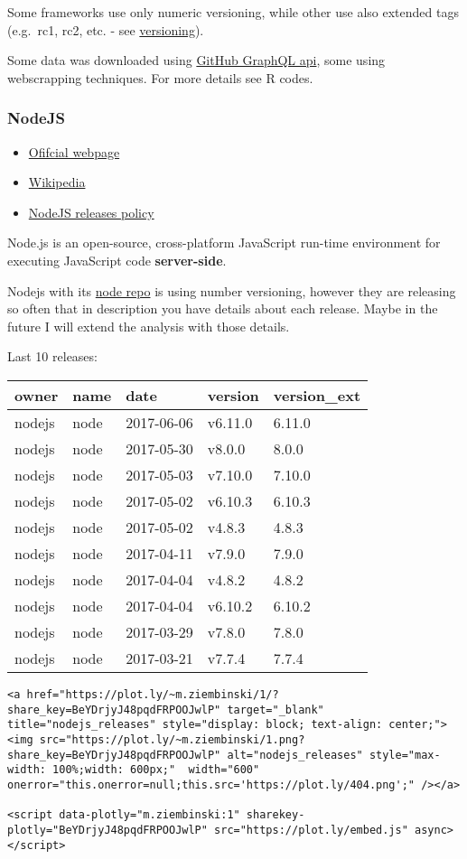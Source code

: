 Some frameworks use only numeric versioning, while other use also
extended tags (e.g.~rc1, rc2, etc. - see
\protect\hyperlink{Versioning}{versioning}).

Some data was downloaded using
\href{https://developer.github.com/v4/}{GitHub GraphQL api}, some using
webscrapping techniques. For more details see R codes.

\subsubsection{NodeJS}\label{nodejs}

\begin{itemize}
\tightlist
\item
  \href{https://nodejs.org/}{Ofifcial webpage}
\item
  \href{https://en.wikipedia.org/wiki/Node.js}{Wikipedia}
\item
  \href{https://nodejs.org/en/about/releases/}{NodeJS releases policy}
\end{itemize}

Node.js is an open-source, cross-platform JavaScript run-time
environment for executing JavaScript code \textbf{server-side}.

Nodejs with its \href{https://github.com/nodejs/node/}{node repo} is
using number versioning, however they are releasing so often that in
description you have details about each release. Maybe in the future I
will extend the analysis with those details.

Last 10 releases:

\begin{longtable}[]{@{}lllll@{}}
\toprule
owner & name & date & version & version\_ext\tabularnewline
\midrule
\endhead
nodejs & node & 2017-06-06 & v6.11.0 & 6.11.0\tabularnewline
nodejs & node & 2017-05-30 & v8.0.0 & 8.0.0\tabularnewline
nodejs & node & 2017-05-03 & v7.10.0 & 7.10.0\tabularnewline
nodejs & node & 2017-05-02 & v6.10.3 & 6.10.3\tabularnewline
nodejs & node & 2017-05-02 & v4.8.3 & 4.8.3\tabularnewline
nodejs & node & 2017-04-11 & v7.9.0 & 7.9.0\tabularnewline
nodejs & node & 2017-04-04 & v4.8.2 & 4.8.2\tabularnewline
nodejs & node & 2017-04-04 & v6.10.2 & 6.10.2\tabularnewline
nodejs & node & 2017-03-29 & v7.8.0 & 7.8.0\tabularnewline
nodejs & node & 2017-03-21 & v7.7.4 & 7.7.4\tabularnewline
\bottomrule
\end{longtable}

\begin{verbatim}
<a href="https://plot.ly/~m.ziembinski/1/?share_key=BeYDrjyJ48pqdFRPOOJwlP" target="_blank" title="nodejs_releases" style="display: block; text-align: center;"><img src="https://plot.ly/~m.ziembinski/1.png?share_key=BeYDrjyJ48pqdFRPOOJwlP" alt="nodejs_releases" style="max-width: 100%;width: 600px;"  width="600" onerror="this.onerror=null;this.src='https://plot.ly/404.png';" /></a>

<script data-plotly="m.ziembinski:1" sharekey-plotly="BeYDrjyJ48pqdFRPOOJwlP" src="https://plot.ly/embed.js" async></script>
\end{verbatim}

